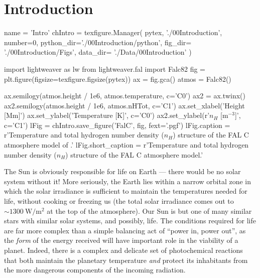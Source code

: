 \chapter{Introduction}
\begin{pycode}[Intro]
name = 'Intro'
chIntro = texfigure.Manager(
    pytex,
    './00Introduction',
    number=0,
    python_dir='./00Introduction/python',
    fig_dir=   './00Introduction/Figs',
    data_dir=  './Data/00Introduction'
)
\end{pycode}


\begin{pycode}[Intro]
import lightweaver as lw
from lightweaver.fal import Falc82
fig = plt.figure(figsize=texfigure.figsize(pytex))
ax = fig.gca()
atmos = Falc82()

ax.semilogy(atmos.height / 1e6, atmos.temperature, c='C0')
ax2 = ax.twinx()
ax2.semilogy(atmos.height / 1e6, atmos.nHTot, c='C1')
ax.set_xlabel('Height [Mm]')
ax.set_ylabel('Temperature [K]', c='C0')
ax2.set_ylabel(r'$n_H$ [m$^{-3}$]', c='C1')
lFig = chIntro.save_figure('FalC', fig, fext='.pgf')
lFig.caption = r'Temperature and total hydrogen number density ($n_H$) structure of the FAL C atmosphere model of \citep{Fontenla1993}.'
lFig.short_caption = r'Temperature and total hydrogen number density ($n_H$) structure of the FAL C atmosphere model.'
\end{pycode}

The Sun is obviously responsible for life on Earth --- there would be no solar system without it!
More seriously, the Earth lies within a narrow orbital zone in which the solar irradiance is sufficient to maintain the temperatures needed for life, without cooking or freezing us (the total solar irradiance comes out to $\sim\SI{1300}{\watt\per\square\m}$ at the top of the atmosphere).
Our Sun is but one of many similar stars with similar solar systems, and possibly, life.
The conditions required for life are far more complex than a simple balancing act of ``power in, power out'', as the \emph{form} of the energy received will have important role in the viability of a planet.
Indeed, there is a complex and delicate set of photochemical reactions that both maintain the planetary temperature \emph{and} protect its inhabitants from the more dangerous components of the incoming radiation.

